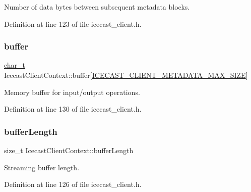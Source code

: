 Number of data bytes between subsequent metadata blocks. 



Definition at line 123 of file icecast\+\_\+client.\+h.

\mbox{\label{structIcecastClientContext_acc09df634fb4b61df4cd759e2f62a68a}} 
\subsubsection{\texorpdfstring{buffer}{buffer}}
{\footnotesize\ttfamily \hyperlink{compiler__port_8h_a40bb5262bf908c328fbcfbe5d29d0201}{char\+\_\+t} Icecast\+Client\+Context\+::buffer\mbox{[}\hyperlink{icecast__client_8h_adeb8d82a71fa7bed56f9a1a2471b2a56}{I\+C\+E\+C\+A\+S\+T\+\_\+\+C\+L\+I\+E\+N\+T\+\_\+\+M\+E\+T\+A\+D\+A\+T\+A\+\_\+\+M\+A\+X\+\_\+\+S\+I\+ZE}\mbox{]}}



Memory buffer for input/output operations. 



Definition at line 130 of file icecast\+\_\+client.\+h.

\mbox{\label{structIcecastClientContext_a4afdc5c305afb3f928fa7e6932832949}} 
\subsubsection{\texorpdfstring{buffer\+Length}{bufferLength}}
{\footnotesize\ttfamily size\+\_\+t Icecast\+Client\+Context\+::buffer\+Length}



Streaming buffer length. 



Definition at line 126 of file icecast\+\_\+client.\+h.

\mbox{\label{structIcecastClientContext_aa5397800dc648f784e4b120e962d6632}} 
